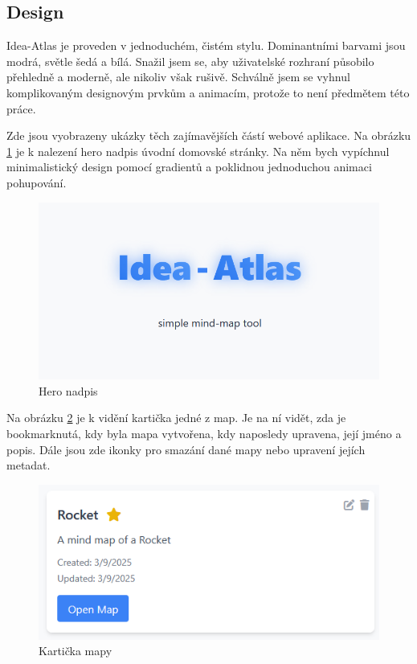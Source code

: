 \subsection{Design}
Idea-Atlas je proveden v jednoduchém, čistém stylu. Dominantními barvami jsou modrá, světle šedá a bílá. Snažil jsem se, aby uživatelské rozhraní působilo přehledně a moderně, ale nikoliv však rušivě. Schválně jsem se vyhnul komplikovaným designovým prvkům a animacím, protože to není předmětem této práce.
\par
Zde jsou vyobrazeny ukázky těch zajímavějších částí webové aplikace. Na obrázku \ref{fig:home} je k nalezení hero nadpis úvodní domovské stránky. Na něm bych vypíchnul minimalistický design pomocí gradientů a poklidnou jednoduchou animaci pohupování.\cite{glow}
\begin{figure}[h]
    \centering
    \includegraphics[width=0.9\linewidth]{Images/Homepage.png}
    \caption{Hero nadpis}
    \label{fig:home}
\end{figure}
\newpage
Na obrázku \ref{fig:card} je k vidění kartička jedné z map. Je na ní vidět, zda je bookmarknutá, kdy byla mapa vytvořena, kdy naposledy upravena, její jméno a popis.\cite{card} Dále jsou zde ikonky pro smazání dané mapy nebo upravení jejích metadat.
\begin{figure}[h]
    \centering
    \includegraphics[width=1\linewidth]{Images/card.png}
    \caption{Kartička mapy}
    \label{fig:card}
\end{figure}
